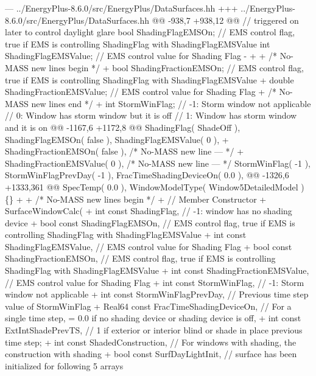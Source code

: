 \begin{DoxyCode}
--- ../EnergyPlus-8.6.0/src/EnergyPlus/DataSurfaces.hh
+++ ../EnergyPlus-8.6.0/src/EnergyPlus/DataSurfaces.hh
@@ -938,7 +938,12 @@
        //       triggered on later to control daylight glare
        bool ShadingFlagEMSOn; // EMS control flag, true if EMS is controlling ShadingFlag with
       ShadingFlagEMSValue
        int ShadingFlagEMSValue; // EMS control value for Shading Flag
-               
+       
+       /* No-MASS new lines begin */
+       bool ShadingFractionEMSOn; // EMS control flag, true if EMS is controlling ShadingFlag with
       ShadingFlagEMSValue
+       double ShadingFractionEMSValue; // EMS control value for Shading Flag
+       /* No-MASS new lines end */
+       
        int StormWinFlag; // -1: Storm window not applicable
        //   0: Window has storm window but it is off
        //   1: Window has storm window and it is on
@@ -1167,6 +1172,8 @@
            ShadingFlag( ShadeOff ),
            ShadingFlagEMSOn( false ),
            ShadingFlagEMSValue( 0 ),
+           ShadingFractionEMSOn( false ), /* No-MASS new line --- */
+           ShadingFractionEMSValue( 0 ), /* No-MASS new line --- */
            StormWinFlag( -1 ),
            StormWinFlagPrevDay( -1 ),
            FracTimeShadingDeviceOn( 0.0 ),
@@ -1326,6 +1333,361 @@
            SpecTemp( 0.0 ),
            WindowModelType( Window5DetailedModel )
        \{\}
+
+       /* No-MASS new lines begin */
+       // Member Constructor
+       SurfaceWindowCalc(
+           int const ShadingFlag, // -1: window has no shading device
+           bool const ShadingFlagEMSOn, // EMS control flag, true if EMS is controlling ShadingFlag with
       ShadingFlagEMSValue
+           int const ShadingFlagEMSValue, // EMS control value for Shading Flag
+           bool const ShadingFractionEMSOn, // EMS control flag, true if EMS is controlling ShadingFlag
       with ShadingFlagEMSValue
+           int const ShadingFractionEMSValue, // EMS control value for Shading Flag
+           int const StormWinFlag, // -1: Storm window not applicable
+           int const StormWinFlagPrevDay, // Previous time step value of StormWinFlag
+           Real64 const FracTimeShadingDeviceOn, // For a single time step, = 0.0 if no shading device or
       shading device is off,
+           int const ExtIntShadePrevTS, // 1 if exterior or interior blind or shade in place previous time
       step;
+           int const ShadedConstruction, // For windows with shading, the construction with shading
+           bool const SurfDayLightInit, // surface has been initialized for following 5 arrays

\end{DoxyCode}
